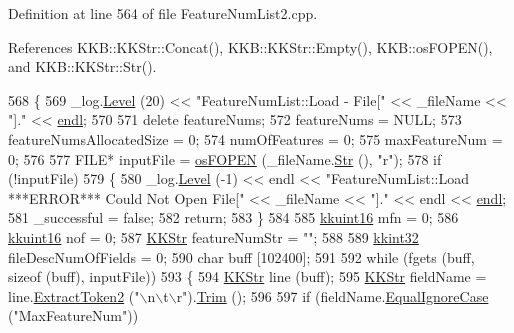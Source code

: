 Definition at line 564 of file Feature\+Num\+List2.\+cpp.



References K\+K\+B\+::\+K\+K\+Str\+::\+Concat(), K\+K\+B\+::\+K\+K\+Str\+::\+Empty(), K\+K\+B\+::os\+F\+O\+P\+E\+N(), and K\+K\+B\+::\+K\+K\+Str\+::\+Str().


\begin{DoxyCode}
568 \{
569   \_log.\hyperlink{class_k_k_b_1_1_run_log_a32cf761d7f2e747465fd80533fdbb659}{Level} (20) << \textcolor{stringliteral}{"FeatureNumList::Load - File["} << \_fileName << \textcolor{stringliteral}{"]."} << 
      \hyperlink{namespace_k_k_b_ad1f50f65af6adc8fa9e6f62d007818a8}{endl};
570 
571   \textcolor{keyword}{delete}  featureNums;
572   featureNums = NULL;
573   featureNumsAllocatedSize = 0;
574   numOfFeatures = 0;
575   maxFeatureNum = 0;
576 
577   FILE*  inputFile = \hyperlink{namespace_k_k_b_abf4050d2916ded8349dafadc80f0ecd1}{osFOPEN} (\_fileName.\hyperlink{class_k_k_b_1_1_k_k_str_ad574e6c0fe7f6ce1ba3ab0a8ce2fbd52}{Str} (), \textcolor{stringliteral}{"r"});
578   \textcolor{keywordflow}{if}  (!inputFile)
579   \{
580     \_log.\hyperlink{class_k_k_b_1_1_run_log_a32cf761d7f2e747465fd80533fdbb659}{Level} (-1) << endl << \textcolor{stringliteral}{"FeatureNumList::Load      ***ERROR***  Could Not Open File["} << 
      \_fileName << \textcolor{stringliteral}{"]."} << endl << \hyperlink{namespace_k_k_b_ad1f50f65af6adc8fa9e6f62d007818a8}{endl};
581     \_successful = \textcolor{keyword}{false};
582     \textcolor{keywordflow}{return};
583   \}
584 
585   \hyperlink{namespace_k_k_b_aa8c7d4d30381c8a0b6fce68974a9c8a9}{kkuint16}  mfn = 0;
586   \hyperlink{namespace_k_k_b_aa8c7d4d30381c8a0b6fce68974a9c8a9}{kkuint16}  nof = 0;
587   \hyperlink{class_k_k_b_1_1_k_k_str}{KKStr}     featureNumStr = \textcolor{stringliteral}{""};
588 
589   \hyperlink{namespace_k_k_b_a8fa4952cc84fda1de4bec1fbdd8d5b1b}{kkint32} fileDescNumOfFields = 0;
590   \textcolor{keywordtype}{char}  buff [102400];
591 
592   \textcolor{keywordflow}{while}  (fgets (buff, \textcolor{keyword}{sizeof} (buff), inputFile))
593   \{
594     \hyperlink{class_k_k_b_1_1_k_k_str}{KKStr}  line (buff);
595     \hyperlink{class_k_k_b_1_1_k_k_str}{KKStr}  fieldName = line.\hyperlink{class_k_k_b_1_1_k_k_str_afe41140cee0520f0be8a3022938a1b03}{ExtractToken2} (\textcolor{stringliteral}{"\(\backslash\)n\(\backslash\)t\(\backslash\)r"}).\hyperlink{class_k_k_b_1_1_k_k_str_aa7fb03387fd7fabca05fba28271b7c20}{Trim} ();
596 
597     \textcolor{keywordflow}{if}  (fieldName.\hyperlink{class_k_k_b_1_1_k_k_str_a562f9696417c53f66bc4088eac072ab5}{EqualIgnoreCase} (\textcolor{stringliteral}{"MaxFeatureNum"}))

\end{DoxyCode}
